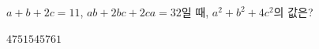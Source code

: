 $a+b+2c=11$, $ab+2bc+2ca=32$일 때, $a^2+b^2+4c^2$의 값은?
\begin{choices32}{$47$}{$51$}{$54$}{$57$}{$61$}\end{choices32}
